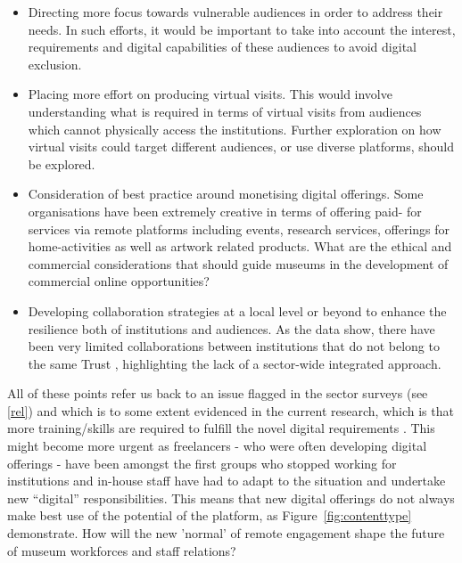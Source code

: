 \documentclass{egpubl}
\begin{document}
\begin{itemize}
\item Directing more focus towards vulnerable audiences in order to address their needs. In such efforts, it would be important to take into account the interest, requirements and digital capabilities of these audiences to avoid digital exclusion.
\item Placing more effort on producing virtual visits. This would involve understanding what is required in terms of virtual visits from audiences which cannot physically access the institutions. Further exploration on how virtual visits could target different audiences, or use diverse platforms, should be explored.
\item Consideration of best practice around monetising digital offerings. Some organisations have been extremely creative in terms of offering paid- for services via remote platforms including events, research services, offerings for home-activities as well as artwork related products. What are the ethical and commercial considerations that should guide museums in the development of commercial online opportunities?
\item Developing collaboration strategies at a local level or beyond to enhance the resilience both of institutions and audiences. As the data show, there have been very limited collaborations between institutions that do not belong to the same Trust \cite{FrankLloydWrightFoundation2020}, highlighting the lack of a sector-wide integrated approach. 
\end{itemize}

All of these points refer us back to an issue flagged in the sector surveys (see \ref{rel}) and which is to some extent evidenced in the current research, which is that more training/skills are required to fulfill the novel digital requirements \cite{Parry2018}. This might become more urgent as freelancers - who were often developing digital offerings - have been amongst the first groups who stopped working for institutions and in-house staff have had to adapt to the situation and undertake new ``digital'' responsibilities. This means that new digital offerings do not always make best use of the potential of the platform, as Figure~\ref{fig:contenttype} demonstrate. How will the new 'normal' of remote engagement shape the future of museum workforces and staff relations?
\end{document}
